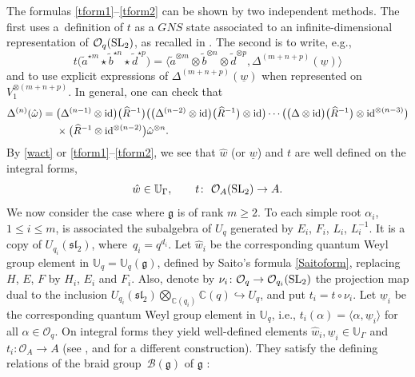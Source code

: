 \documentclass[pdftex]{sigma}
\numberwithin{equation}{section}
\theoremstyle{definition}
\newcommand{\mUq}{\mathbb{U}_q}
\newcommand{\mc}{\mathbb{C}}
\newcommand{\Oo}{{\mathcal O}}
\newcommand{\ra}{\rightarrow}
\begin{document}
The formulas \eqref{tform1}--\eqref{tform2} can be shown by two independent methods. The first uses a~definition of $t$ as a $GNS$ state associated to an infinite-dimensional representation of $\Oo_q({\rm SL}_2)$, as recalled in \cite[Section 1.6]{DC-L}. The second is to write, e.g.,
\begin{equation}\label{twformcop}
t\big(\tilde{a}^{\star m}\star \tilde{b}^{\star n}\star \tilde{d}^{\star p}\big) = \big\langle \tilde{a}^{\otimes m}\otimes \tilde{b}^{\otimes n}\otimes \tilde{d}^{\otimes p}, \Delta^{(m+n+p)}(\underline{w})\big\rangle
\end{equation}
and to use explicit expressions of $\Delta^{(m+n+p)}(\underline{w})$ when represented on $V_1^{\otimes (m+n+p)}$. In general, one can check that
\begin{align*}%
\Delta^{(n)}(\hat{\omega}) ={}&\big( \Delta^{(n-1)} \otimes {\rm id}\big)\big(\widehat{R}^{-1}\big)\big(\big( \Delta^{(n-2)} \otimes {\rm id}\big)\big(\widehat{R}^{-1}\big) \otimes {\rm id}\big)\cdots \big(\big( \Delta \otimes {\rm id}\big)\big(\widehat{R}^{-1}\big) \otimes {\rm id}^{\otimes (n-3)}\big)\\ &\times\big(\widehat{R}^{-1} \otimes {\rm id}^{\otimes (n-2)}\big)\hat{\omega}^{\otimes n}.
\end{align*}
By \eqref{wact} or \eqref{tform1}--\eqref{tform2}, we see that $\hat{w}$ (or $\underline{w}$) and $t$ are well defined on the integral forms,
\[\hat{w} \in \mathbb{U}_{\Gamma},\qquad t \colon\ \Oo_A({\rm SL}_2)\ra A.\]
We now consider the case where $\mathfrak{g}$ is of rank $m\geq 2$. To each simple root $\alpha_i$, $1\leq i\leq m$, is associated the subalgebra of $U_q$ generated by $E_i$, $F_i$, $L_i$, $L_i^{-1}$. It is a copy of $U_{q_i}({\mathfrak{sl}_2})$, where~${q_i = q^{d_i}}$. Let $\hat{w}_i$ be the corresponding quantum Weyl group element in $\mUq = \mUq(\mathfrak{g})$, defined by Saito's formula \eqref{Saitoform}, replacing $H$, $E$, $F$ by $H_i$, $E_i$ and $F_i$. Also, denote by $\nu_i \colon \mathcal{O}_q \ra \mathcal{O}_{q_i}({\rm SL}_2)$ the projection map dual to the inclusion $U_{q_i}({\mathfrak{sl}_2}) \bigotimes_{\mc(q_i)} \mc(q)\hookrightarrow U_q$, and put $t_i = t \circ \nu_i$. Let $\underline{w}_i$ be the corresponding quantum Weyl group element in $\mUq$, i.e., $t_i(\alpha) = \langle \alpha,\underline{w}_i\rangle$ for all $\alpha\in \Oo_q$. On integral forms they yield well-defined elements $\hat{w}_i,\underline{w}_i \in \mathbb{U}_{\Gamma}$ and $t_i\colon \Oo_A \ra A$ (see \cite[Proposition~5.1]{DC-L}, and \cite{Lusztig3} for a different construction). They satisfy the defining relations of the braid group~$\mathcal{B}(\mathfrak{g})$ of $\mathfrak{g}$ \cite{KirRes}:
\end{document}
